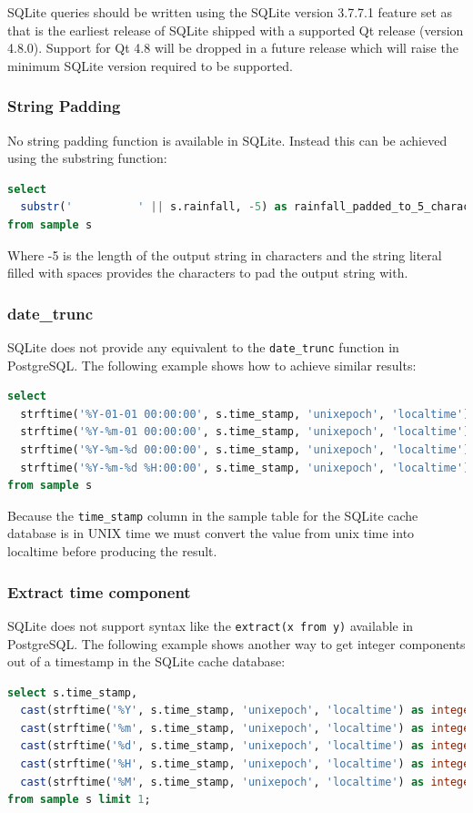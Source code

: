 \documentclass[a4paper,10pt]{book}
\begin{document}
SQLite queries should be written using the SQLite version 3.7.7.1 feature set as that is the earliest release of SQLite shipped with a supported Qt release (version 4.8.0). Support for Qt 4.8 will be dropped in a future release which will raise the minimum SQLite version required to be supported.

\subsubsection{String Padding}
No string padding function is available in SQLite. Instead this can be achieved using the substring function:
\begin{lstlisting}[language=SQL]
select
  substr('          ' || s.rainfall, -5) as rainfall_padded_to_5_characters
from sample s
\end{lstlisting}
Where -5 is the length of the output string in characters and the string literal filled with spaces provides the characters to pad the output string with.

\subsubsection{date\_trunc}
SQLite does not provide any equivalent to the \verb|date_trunc| function in PostgreSQL. The following example shows how to achieve similar results:
\begin{lstlisting}[language=SQL]
select
  strftime('%Y-01-01 00:00:00', s.time_stamp, 'unixepoch', 'localtime') as trunc_year,
  strftime('%Y-%m-01 00:00:00', s.time_stamp, 'unixepoch', 'localtime') as trunc_month,
  strftime('%Y-%m-%d 00:00:00', s.time_stamp, 'unixepoch', 'localtime') as trunc_day,
  strftime('%Y-%m-%d %H:00:00', s.time_stamp, 'unixepoch', 'localtime') as trunc_hour
from sample s
\end{lstlisting}
Because the \verb|time_stamp| column in the sample table for the SQLite cache database is in UNIX time we must convert the value from unix time into localtime before producing the result.

\subsubsection{Extract time component}
SQLite does not support syntax like the \verb|extract(x from y)| available in PostgreSQL. The following example shows another way to get integer components out of a timestamp in the SQLite cache database:
\begin{lstlisting}[language=SQL]
select s.time_stamp,
  cast(strftime('%Y', s.time_stamp, 'unixepoch', 'localtime') as integer) as year,
  cast(strftime('%m', s.time_stamp, 'unixepoch', 'localtime') as integer) as month,
  cast(strftime('%d', s.time_stamp, 'unixepoch', 'localtime') as integer) as day,
  cast(strftime('%H', s.time_stamp, 'unixepoch', 'localtime') as integer) as hour,
  cast(strftime('%M', s.time_stamp, 'unixepoch', 'localtime') as integer) as minute
from sample s limit 1;
\end{lstlisting}
\end{document}
